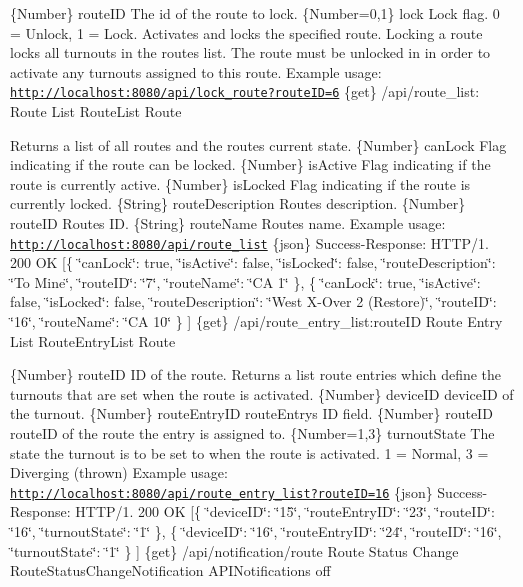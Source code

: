 \{Number\} route\+ID The id of the route to lock.  \{Number=0,1\} lock Lock flag. 0 = Unlock, 1 = Lock.  Activates and locks the specified route. Locking a route locks all turnouts in the route\textquotesingle{}s list. The route must be unlocked in in order to activate any turnouts assigned to this route.  Example usage\+: \href{http://localhost:8080/api/lock_route?routeID=6}{\tt http\+://localhost\+:8080/api/lock\+\_\+route?route\+I\+D=6}  \{get\} /api/route\+\_\+list\+: Route List  Route\+List  Route

Returns a list of all routes and the routes current state.  \{Number\} can\+Lock Flag indicating if the route can be locked.  \{Number\} is\+Active Flag indicating if the route is currently active.  \{Number\} is\+Locked Flag indicating if the route is currently locked.  \{String\} route\+Description Route\textquotesingle{}s description.  \{Number\} route\+ID Route\textquotesingle{}s ID.  \{String\} route\+Name Route\textquotesingle{}s name.  Example usage\+: \href{http://localhost:8080/api/route_list}{\tt http\+://localhost\+:8080/api/route\+\_\+list}  \{json\} Success-\/\+Response\+: H\+T\+T\+P/1. 200 OK \mbox{[}\{ \char`\"{}can\+Lock\char`\"{}\+: true, \char`\"{}is\+Active\char`\"{}\+: false, \char`\"{}is\+Locked\char`\"{}\+: false, \char`\"{}route\+Description\char`\"{}\+: \char`\"{}\+To Mine\char`\"{}, \char`\"{}route\+I\+D\char`\"{}\+: \char`\"{}7\char`\"{}, \char`\"{}route\+Name\char`\"{}\+: \char`\"{}\+C\+A 1\char`\"{} \}, \{ \char`\"{}can\+Lock\char`\"{}\+: true, \char`\"{}is\+Active\char`\"{}\+: false, \char`\"{}is\+Locked\char`\"{}\+: false, \char`\"{}route\+Description\char`\"{}\+: \char`\"{}\+West X-\/\+Over 2 (\+Restore)\char`\"{}, \char`\"{}route\+I\+D\char`\"{}\+: \char`\"{}16\char`\"{}, \char`\"{}route\+Name\char`\"{}\+: \char`\"{}\+C\+A 10\char`\"{} \} \mbox{]}  \{get\} /api/route\+\_\+entry\+\_\+list\+:route\+ID Route Entry List  Route\+Entry\+List  Route

\{Number\} route\+ID ID of the route.  Returns a list route entries which define the turnouts that are set when the route is activated.  \{Number\} device\+ID device\+ID of the turnout.  \{Number\} route\+Entry\+ID route\+Entry\textquotesingle{}s ID field.  \{Number\} route\+ID route\+ID of the route the entry is assigned to.  \{Number=1,3\} turnout\+State The state the turnout is to be set to when the route is activated. 1 = Normal, 3 = Diverging (thrown)  Example usage\+: \href{http://localhost:8080/api/route_entry_list?routeID=16}{\tt http\+://localhost\+:8080/api/route\+\_\+entry\+\_\+list?route\+I\+D=16}  \{json\} Success-\/\+Response\+: H\+T\+T\+P/1. 200 OK \mbox{[}\{ \char`\"{}device\+I\+D\char`\"{}\+: \char`\"{}15\char`\"{}, \char`\"{}route\+Entry\+I\+D\char`\"{}\+: \char`\"{}23\char`\"{}, \char`\"{}route\+I\+D\char`\"{}\+: \char`\"{}16\char`\"{}, \char`\"{}turnout\+State\char`\"{}\+: \char`\"{}1\char`\"{} \}, \{ \char`\"{}device\+I\+D\char`\"{}\+: \char`\"{}16\char`\"{}, \char`\"{}route\+Entry\+I\+D\char`\"{}\+: \char`\"{}24\char`\"{}, \char`\"{}route\+I\+D\char`\"{}\+: \char`\"{}16\char`\"{}, \char`\"{}turnout\+State\char`\"{}\+: \char`\"{}1\char`\"{} \} \mbox{]}  \{get\} /api/notification/route Route Status Change  Route\+Status\+Change\+Notification  A\+P\+I\+Notifications  off

